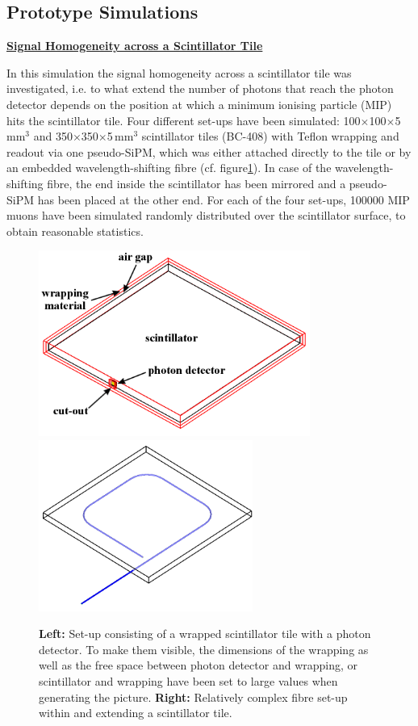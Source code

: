 \subsection{Prototype Simulations}
\label{sec:prototypeSimulations}

\textbf{\underline{Signal Homogeneity across a Scintillator Tile}}

In this simulation the signal homogeneity across a scintillator tile was investigated, i.e. to what extend the number of photons that reach the photon detector depends on the position at which a minimum ionising particle (MIP) hits the scintillator tile. Four different set-ups have been simulated: 100$\times$100$\times$5$\,$mm$^3$ and 350$\times$350$\times$5$\,$mm$^3$ scintillator tiles (BC-408) with Teflon wrapping and readout via one pseudo-SiPM, which was either attached directly to the tile or by an embedded wavelength-shifting fibre (cf. figure\enspace\ref{fig:simulatedSetups}). In case of the wavelength-shifting fibre, the end inside the scintillator has been mirrored and a pseudo-SiPM has been placed at the other end. For each of the four set-ups, 100000 MIP muons have been simulated randomly distributed over the scintillator surface, to obtain reasonable statistics.

\begin{figure}[h]
  \centering
  \includegraphics[width=8.9cm]{Figures/dietzlaursonn/wrapping.png}
  \includegraphics[width=7cm]{Figures/dietzlaursonn/fibre_sigma.png}
  \caption{\textbf{Left:} Set-up consisting of a wrapped scintillator tile with a photon detector. To make them visible, the dimensions of the wrapping as well as the free space between photon detector and wrapping, or scintillator and wrapping have been set to large values when generating the picture. \textbf{Right:} Relatively complex fibre set-up within and extending a scintillator tile.}
  \label{fig:simulatedSetups}
\end{figure}

